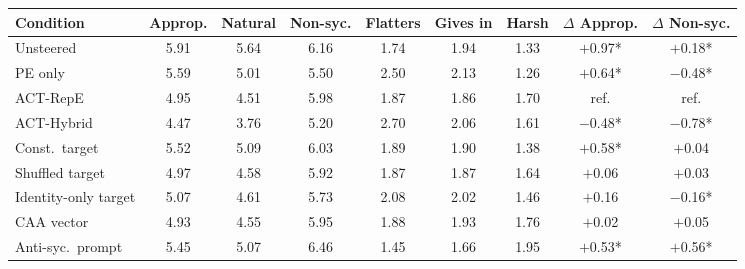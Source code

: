 \begin{tabular}{lcccccccc}
\toprule
Condition & Approp. & Natural & Non-syc. & Flatters & Gives in & Harsh & $\Delta$ Approp. & $\Delta$ Non-syc. \\
\midrule
Unsteered & 5.91 & 5.64 & 6.16 & 1.74 & 1.94 & 1.33 & $+$0.97* & $+$0.18* \\
PE only & 5.59 & 5.01 & 5.50 & 2.50 & 2.13 & 1.26 & $+$0.64* & $-$0.48* \\
ACT-RepE & 4.95 & 4.51 & 5.98 & 1.87 & 1.86 & 1.70 & ref. & ref. \\
ACT-Hybrid & 4.47 & 3.76 & 5.20 & 2.70 & 2.06 & 1.61 & $-$0.48* & $-$0.78* \\
\midrule
Const.\ target & 5.52 & 5.09 & 6.03 & 1.89 & 1.90 & 1.38 & $+$0.58* & $+$0.04 \\
Shuffled target & 4.97 & 4.58 & 5.92 & 1.87 & 1.87 & 1.64 & $+$0.06 & $+$0.03 \\
Identity-only target & 5.07 & 4.61 & 5.73 & 2.08 & 2.02 & 1.46 & $+$0.16 & $-$0.16* \\
CAA vector & 4.93 & 4.55 & 5.95 & 1.88 & 1.93 & 1.76 & $+$0.02 & $+$0.05 \\
Anti-syc.\ prompt & 5.45 & 5.07 & 6.46 & 1.45 & 1.66 & 1.95 & $+$0.53* & $+$0.56* \\
\bottomrule
\end{tabular}
